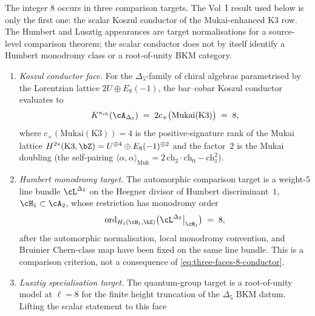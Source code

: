 \begin{remark}
\label{rem:arith-shad-8}%
%
%
%
%
The integer $8$ occurs in three comparison targets. The Vol~I result
used below is only the first one: the scalar Koszul conductor of the
Mukai-enhanced K3 row. The Humbert and Lusztig appearances are target
normalisations for a source-level comparison theorem; the scalar
conductor does not by itself identify a Humbert monodromy class or a
root-of-unity BKM category.
\begin{enumerate}[label=\textup{(\roman*)}]
\item \emph{Koszul conductor face.} For the $\Delta_5$-family of
chiral algebras parametrised by the Lorentzian lattice $2U \oplus
E_8(-1)$, the bar--cobar Koszul conductor evaluates to
\begin{equation}\label{eq:three-faces-8-conductor}
 K^{\kappa_{\mathrm{ch}}}(\cA_{\Delta_5})
 \;=\;
 2 c_+\bigl(\mathrm{Mukai}(\mathrm{K3})\bigr)
 \;=\;
 8,
\end{equation}
where $c_+(\mathrm{Mukai}(\mathrm{K3})) = 4$ is the positive-signature
rank of the Mukai lattice $H^{2*}(\mathrm{K3}, \bZ) = U^{\oplus 4}
\oplus E_8(-1)^{\oplus 2}$ and the factor~$2$ is the Mukai doubling
(the self-pairing $\langle \alpha, \alpha \rangle_{\mathrm{Muk}} =
2\,\mathrm{ch}_2 \cdot \mathrm{ch}_0 - \mathrm{ch}_1^2$).
\item \emph{Humbert monodromy target.} The automorphic comparison target
is a weight-$5$ line bundle $\cL^{\Delta_5}$ on the Heegner divisor of
Humbert discriminant~$1$, $\cH_1\subset\cA_2$, whose restriction has
monodromy order
\begin{equation}\label{eq:three-faces-8-monodromy}
 \operatorname{ord}_{H_1(\cH_1, \bZ)}
 \bigl(\cL^{\Delta_5}\big|_{\cH_1}\bigr)
 \;=\;
 8,
\end{equation}
after the automorphic normalisation, local monodromy convention, and
Bruinier Chern-class map
\cite[Prop.~5.1]{Bruinier2002} have been fixed on the same line
bundle. This is a comparison criterion, not a consequence of
\eqref{eq:three-faces-8-conductor}.
\item \emph{Lusztig specialisation target.} The quantum-group target is
a root-of-unity model at $\ell=8$ for the finite height truncation of
the $\Delta_5$ BKM datum. Lifting the scalar statement to this face

\end{enumerate}
\end{remark}

